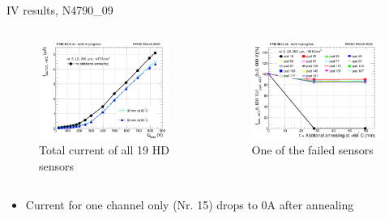 \documentclass{beamer}
\begin{document}
\begin{frame}{IV results, N4790\_09}
  \begin{columns}
       \begin{figure}
           \includegraphics[width=1.0\textwidth]{plots/annealing_IV_ch101_N4790_09.png}
           \caption{Total current of all 19 HD sensors}
       \end{figure}

       \begin{figure}
           \includegraphics[width=1.0\textwidth]{plots/annealing_current_N4790_09.png}
           \caption{One of the failed sensors}
       \end{figure}
   \end{columns}
   \begin{itemize}
      \item Current for one channel only (Nr. 15) drops to 0A after annealing
   \end{itemize}
\end{frame}
\end{document}
